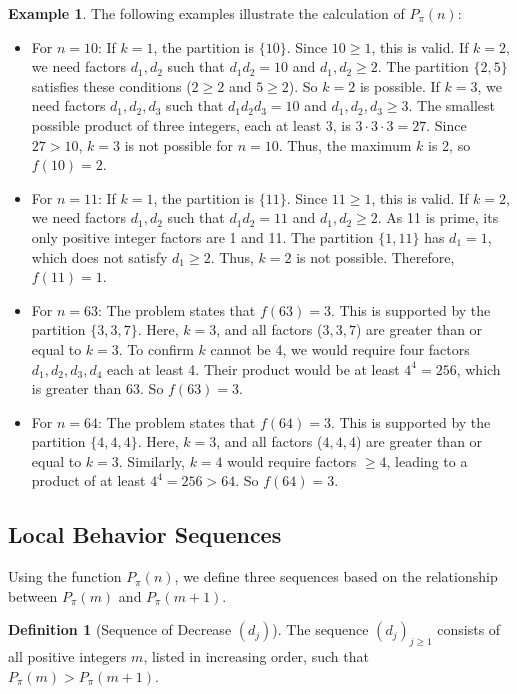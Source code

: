 \documentclass[]{article}
\theoremstyle{plain}%
\theoremstyle{definition}
\newtheorem{defn}{Definition}[section]
\newtheorem{exmp}{Example}[section]
\theoremstyle{remark}
\begin{document}
\begin{exmp}
	The following examples illustrate the calculation of $P_{\pi}(n)$:
	\begin{itemize}
		\item For $n=10$:
		If $k=1$, the partition is $\{10\}$. Since $10 \ge 1$, this is valid.
		If $k=2$, we need factors $d_1, d_2$ such that $d_1 d_2 = 10$ and $d_1, d_2 \ge 2$. The partition $\{2,5\}$ satisfies these conditions ($2 \ge 2$ and $5 \ge 2$). So $k=2$ is possible.
		If $k=3$, we need factors $d_1, d_2, d_3$ such that $d_1 d_2 d_3 = 10$ and $d_1, d_2, d_3 \ge 3$. The smallest possible product of three integers, each at least 3, is $3 \cdot 3 \cdot 3 = 27$. Since $27 > 10$, $k=3$ is not possible for $n=10$.
		Thus, the maximum $k$ is 2, so $f(10)=2$.
		
		\item For $n=11$:
		If $k=1$, the partition is $\{11\}$. Since $11 \ge 1$, this is valid.
		If $k=2$, we need factors $d_1, d_2$ such that $d_1 d_2 = 11$ and $d_1, d_2 \ge 2$. As 11 is prime, its only positive integer factors are 1 and 11. The partition $\{1,11\}$ has $d_1=1$, which does not satisfy $d_1 \ge 2$. Thus, $k=2$ is not possible.
		Therefore, $f(11)=1$.
		
		\item For $n=63$:
		The problem states that $f(63)=3$. This is supported by the partition $\{3,3,7\}$. Here, $k=3$, and all factors ($3,3,7$) are greater than or equal to $k=3$.
		To confirm $k$ cannot be 4, we would require four factors $d_1, d_2, d_3, d_4$ each at least 4. Their product would be at least $4^4 = 256$, which is greater than 63. So $f(63)=3$.
		
		\item For $n=64$:
		The problem states that $f(64)=3$. This is supported by the partition $\{4,4,4\}$. Here, $k=3$, and all factors ($4,4,4$) are greater than or equal to $k=3$.
		Similarly, $k=4$ would require factors $\ge 4$, leading to a product of at least $4^4=256 > 64$. So $f(64)=3$.
	\end{itemize}
\end{exmp}
\subsection{Local Behavior Sequences}
Using the function $P_{\pi}(n)$, we define three sequences based on the relationship between $P_{\pi}(m)$ and $P_{\pi}(m+1)$.

\begin{defn}[Sequence of Decrease $(d_j)$]
	The sequence $(d_j)_{j \ge 1}$ consists of all positive integers $m$, listed in increasing order, such that $P_{\pi}(m) > P_{\pi}(m+1)$.
\end{defn}
\end{document}
